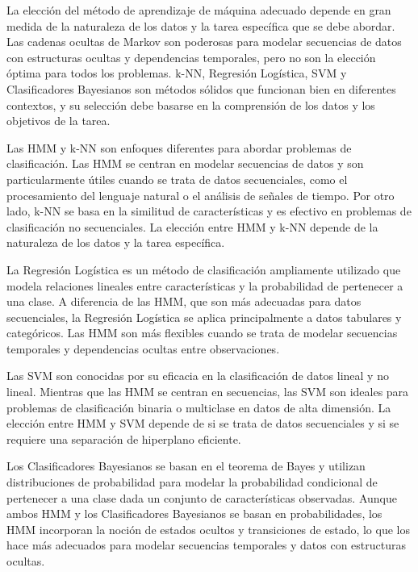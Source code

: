 \documentclass[12pt]{article}
\begin{document}
La elección del método de aprendizaje de máquina adecuado depende en gran
medida de la naturaleza de los datos y la tarea específica que se debe abordar.
Las cadenas ocultas de Markov son poderosas para modelar secuencias de
datos con estructuras ocultas y dependencias temporales, pero no son la
elección óptima para todos los problemas. k-NN, Regresión Logística, SVM y
Clasificadores Bayesianos son métodos sólidos que funcionan bien en
diferentes contextos, y su selección debe basarse en la comprensión de los
datos y los objetivos de la tarea.\vspace{1cm}


Las HMM y k-NN son enfoques diferentes para abordar problemas de
clasificación. Las HMM se centran en modelar secuencias de datos y son
particularmente útiles cuando se trata de datos secuenciales, como el
procesamiento del lenguaje natural o el análisis de señales de tiempo. Por otro
lado, k-NN se basa en la similitud de características y es efectivo en problemas
de clasificación no secuenciales. La elección entre HMM y k-NN depende de la
naturaleza de los datos y la tarea específica.\vspace{1cm}


La Regresión Logística es un método de clasificación ampliamente utilizado
que modela relaciones lineales entre características y la probabilidad de
pertenecer a una clase. A diferencia de las HMM, que son más adecuadas para
datos secuenciales, la Regresión Logística se aplica principalmente a datos
tabulares y categóricos. Las HMM son más flexibles cuando se trata de
modelar secuencias temporales y dependencias ocultas entre observaciones.\vspace{1cm}


Las SVM son conocidas por su eficacia en la clasificación de datos lineal y no
lineal. Mientras que las HMM se centran en secuencias, las SVM son ideales
para problemas de clasificación binaria o multiclase en datos de alta
dimensión. La elección entre HMM y SVM depende de si se trata de datos
secuenciales y si se requiere una separación de hiperplano eficiente.\vspace{1cm}


Los Clasificadores Bayesianos se basan en el teorema de Bayes y utilizan
distribuciones de probabilidad para modelar la probabilidad condicional de
pertenecer a una clase dada un conjunto de características observadas.
Aunque ambos HMM y los Clasificadores Bayesianos se basan en
probabilidades, los HMM incorporan la noción de estados ocultos y transiciones
de estado, lo que los hace más adecuados para modelar secuencias
temporales y datos con estructuras ocultas.\vspace{1cm}
\end{document}

